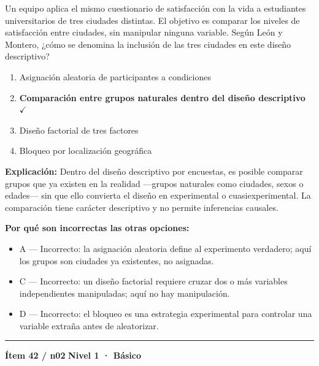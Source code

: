 \documentclass[12pt,a4paper]{article}
\begin{document}
Un equipo aplica el mismo cuestionario de satisfacción con la vida a estudiantes universitarios de tres ciudades distintas. El objetivo es comparar los niveles de satisfacción entre ciudades, sin manipular ninguna variable. Según León y Montero, ¿cómo se denomina la inclusión de las tres ciudades en este diseño descriptivo?

\begin{enumerate}
  \item[A.] Asignación aleatoria de participantes a condiciones
  \item[\textbf{\color{verde}B.}] \textbf{\color{verde} Comparación entre grupos naturales dentro del diseño descriptivo} \hfill $\checkmark$
  \item[C.] Diseño factorial de tres factores
  \item[D.] Bloqueo por localización geográfica
\end{enumerate}

\noindent\textbf{\color{azul}Explicación:} Dentro del diseño descriptivo por encuestas, es posible comparar grupos que ya existen en la realidad —grupos naturales como ciudades, sexos o edades— sin que ello convierta el diseño en experimental o cuasiexperimental. La comparación tiene carácter descriptivo y no permite inferencias causales.

\noindent\textbf{\color{gris}Por qué son incorrectas las otras opciones:}
\begin{itemize}
  \item {\small A — Incorrecto: la asignación aleatoria define al experimento verdadero; aquí los grupos son ciudades ya existentes, no asignadas.}
  \item {\small C — Incorrecto: un diseño factorial requiere cruzar dos o más variables independientes manipuladas; aquí no hay manipulación.}
  \item {\small D — Incorrecto: el bloqueo es una estrategia experimental para controlar una variable extraña antes de aleatorizar.}
\end{itemize}
\vspace{8pt}\hrule\vspace{10pt}

\begin{mdframed}[backgroundcolor=fondogris,linecolor=azul,linewidth=1pt,innerleftmargin=10pt,innerrightmargin=10pt,innertopmargin=7pt,innerbottommargin=7pt]
\textbf{Ítem 42 / n02} \hfill {\small\bfseries\color{azul} Nivel 1 · Básico}
\end{mdframed}
\end{document}
